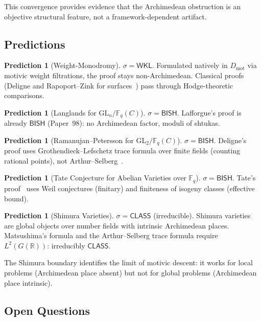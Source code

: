 \documentclass[11pt,a4paper]{article}
\theoremstyle{plain}
\theoremstyle{definition}
\newtheorem{prediction}[theorem]{Prediction}
\newcommand{\BISH}{\textsf{BISH}}
\newcommand{\WKL}{\textsf{WKL}}
\newcommand{\CLASS}{\textsf{CLASS}}
\newcommand{\Dmot}{D_{\mathrm{mot}}}
\newcommand{\GL}{\mathrm{GL}}
\newcommand{\R}{\mathbb{R}}
\newcommand{\F}{\mathbb{F}}
\newcommand{\sig}{\sigma}
\begin{document}
This convergence provides evidence that the Archimedean obstruction is an objective structural feature, not a framework-dependent artifact.

\subsection{Predictions}

\begin{prediction}[Weight-Monodromy]\label{pred:wm}
$\sig = \WKL$. Formulated natively in $\Dmot$ via motivic weight filtrations, the proof stays non-Archimedean. Classical proofs (Deligne and Rapoport--Zink for surfaces~\cite{deligne-hodge2, rapoport-zink}) pass through Hodge-theoretic comparisons.
\end{prediction}

\begin{prediction}[Langlands for $\GL_n/\F_q(C)$]\label{pred:ffl}
$\sig = \BISH$. Lafforgue's proof is already $\BISH$ (Paper~98): no Archimedean factor, moduli of shtukas.
\end{prediction}

\begin{prediction}[Ramanujan--Petersson for $\GL_2/\F_q(C)$]\label{pred:rp}
$\sig = \BISH$. Deligne's proof uses Grothendieck--Lefschetz trace formula over finite fields (counting rational points), not Arthur--Selberg~\cite{deligne-weil2}.
\end{prediction}

\begin{prediction}[Tate Conjecture for Abelian Varieties over $\F_q$]\label{pred:tate}
$\sig = \BISH$. Tate's proof~\cite{tate66} uses Weil conjectures (finitary) and finiteness of isogeny classes (effective bound).
\end{prediction}

\begin{prediction}[Shimura Varieties]\label{pred:shimura}
$\sig = \CLASS$ (irreducible). Shimura varieties are global objects over number fields with intrinsic Archimedean places. Matsushima's formula and the Arthur--Selberg trace formula require $L^2(G(\R))$: irreducibly $\CLASS$.
\end{prediction}

The Shimura boundary identifies the limit of motivic descent: it works for local problems (Archimedean place absent) but not for global problems (Archimedean place intrinsic).

\subsection{Open Questions}
\end{document}
